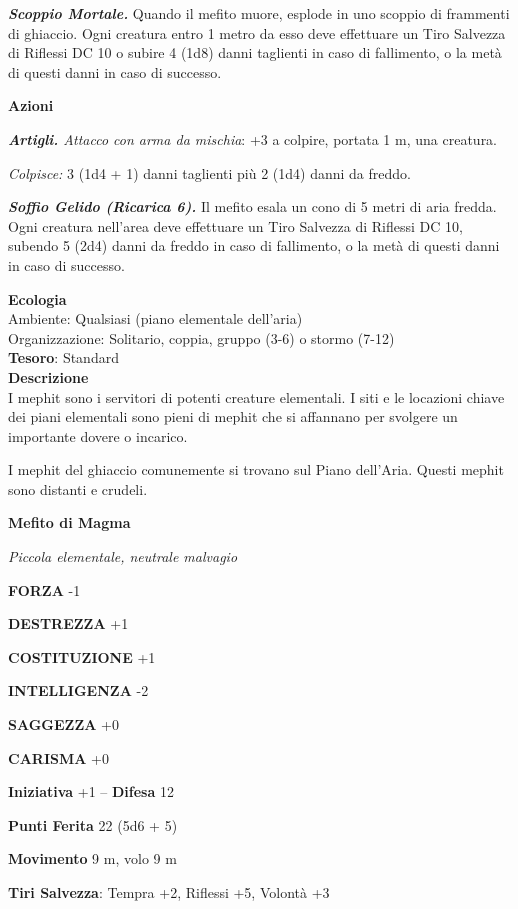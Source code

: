\begin{multicols}{2}
	\textit{\textbf{Scoppio Mortale.}} Quando il mefito muore, esplode in uno scoppio di frammenti di ghiaccio. Ogni creatura entro 1 metro da esso deve effettuare un Tiro Salvezza di Riflessi DC 10 o subire 4 (1d8) danni taglienti in caso di fallimento, o la metà di questi danni in caso
	di successo.

	\textbf{Azioni}

	\textit{\textbf{Artigli.} Attacco con arma da mischia}: +3 a colpire, portata 1 m, una creatura.

	\textit{Colpisce:} 3 (1d4 + 1) danni taglienti più 2 (1d4) danni da freddo.

	\textit{\textbf{Soffio Gelido (Ricarica 6).}} Il mefito esala un cono di 5 metri di aria fredda. Ogni creatura nell'area deve effettuare un Tiro Salvezza di Riflessi DC 10, subendo 5 (2d4) danni da freddo in caso di fallimento, o la metà di questi danni in caso di successo.

	\textbf{Ecologia}\\
	Ambiente: Qualsiasi (piano elementale dell'aria)\\
	Organizzazione: Solitario, coppia, gruppo (3-6) o stormo (7-12)\\
	\textbf{Tesoro}: Standard\\
	\textbf{Descrizione}\\
	I mephit sono i servitori di potenti creature elementali. I siti e le locazioni chiave dei piani elementali sono pieni di mephit che si affannano per svolgere un importante dovere o incarico.

	I mephit del ghiaccio comunemente si trovano sul Piano dell'Aria. Questi mephit sono distanti e crudeli.


	\medskip{}\textbf{Mefito di Magma}

	\textit{Piccola elementale, neutrale malvagio}

	\textbf{FORZA} -1

	\textbf{DESTREZZA} +1

	\textbf{COSTITUZIONE} +1

	\textbf{INTELLIGENZA} -2

	\textbf{SAGGEZZA} +0

	\textbf{CARISMA} +0

	\textbf{Iniziativa} +1 -- \textbf{Difesa} 12

	\textbf{Punti Ferita} 22 (5d6 + 5)

	\textbf{Movimento} 9 m, volo 9 m

	\textbf{Tiri Salvezza}: Tempra +2, Riflessi +5, Volontà +3


\end{multicols}

